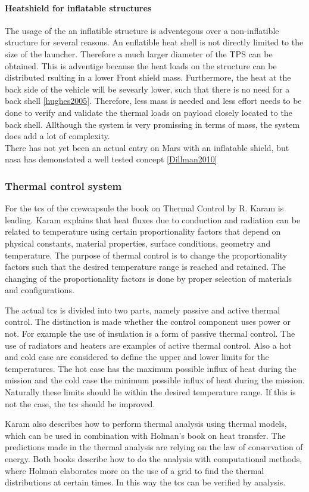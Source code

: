\paragraph{Heatshield for inflatable structures}
The usage of the an inflatible structure is adventegous over a non-inflatible structure for several reasons. An enflatible heat shell is not directly limited to the size of the launcher. Therefore a much larger diameter of the TPS can be obtained. This is adventige because the heat loads on the structure can be distributed rsulting in a lower Front shield mass. Furthermore, the heat at the back side of the vehicle will be sevearly lower, such that there is no need for a back shell \ref{hughes2005}. Therefore, less mass is needed and less effort needs to be done to verify and validate the thermal loads on payload closely located to the back shell. Allthough the system is very promissing in terms of mass, the system does add a lot of complexity.\\

There has not yet been an actual entry on Mars with an inflatable shield, but nasa has demonstated a well tested concept \ref{Dillman2010} 


\subsubsection{Thermal control system}
For the \gls{tcs} of the crewcapsule the book on Thermal Control by R. Karam is leading. \cite{Karam1998} Karam explains that heat fluxes due to conduction and radiation can be related to temperature using certain proportionality factors that depend on physical constants, material properties, surface conditions, geometry and temperature. The purpose of thermal control is to change the proportionality factors such that the desired temperature range is reached and retained. The changing of the proportionality factors is done by proper selection of materials and configurations.

The actual \gls{tcs} is divided into two parts, namely passive and active thermal control. The distinction is made whether the control component uses power or not. For example the use of insulation is a form of passive thermal control. The use of radiators and heaters are examples of active thermal control. Also a hot and cold case are considered to define the upper and lower limits for the temperatures. The hot case has the maximum possible influx of heat during the mission and the cold case the minimum possible influx of heat during the mission. Naturally these limits should lie within the desired temperature range. If this is not the case, the \gls{tcs} should be improved.

Karam also describes how to perform thermal analysis using thermal models, which can be used in combination with Holman's book on heat transfer. \cite{Holman2002} The predictions made in the thermal analysis are relying on the law of conservation of energy. Both books describe how to do the analysis with computational methods, where Holman elaborates more on the use of a grid to find the thermal distributions at certain times. In this way the \gls{tcs} can be verified by analysis.




